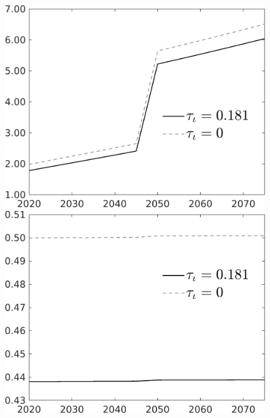 \documentclass[12pt]{article}
\begin{document}
\begin{figure}[h!!]
\begin{minipage}[]{0.32\textwidth}
\includegraphics[width=1\textwidth]{../../codding_model/own_basedOnFried/optimalPol_010922_revision/figures/all_13Sept22/CompTauf_bytaul_Reg0_tauf_spillover0_nsk0_xgr0_knspil0_sep0_LFlimit1_emsbase0_countec0_GovRev0_etaa0.79_lgd1.png}
\end{minipage}	
\begin{minipage}[]{0.32\textwidth}
\includegraphics[width=1\textwidth]{../../codding_model/own_basedOnFried/optimalPol_010922_revision/figures/all_13Sept22/CompTauf_bytaul_Reg0_hh_spillover0_nsk0_xgr0_knspil0_sep0_LFlimit1_emsbase0_countec0_GovRev0_etaa0.79_lgd1.png}

\end{minipage}
\end{figure}
\end{document}
